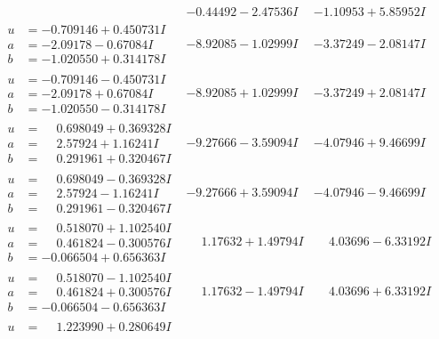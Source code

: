 \documentclass[1p]{elsarticle_modified}
\theoremstyle{definition}
\begin{document}
$$\begin{array}{c|c|c}
 & -0.44492 - 2.47536 I & -1.10953 + 5.85952 I \\ \hline\begin{aligned}
u &= -0.709146 + 0.450731 I \\
a &= -2.09178 - 0.67084 I \\
b &= -1.020550 + 0.314178 I\end{aligned}
 & -8.92085 - 1.02999 I & -3.37249 - 2.08147 I \\ \hline\begin{aligned}
u &= -0.709146 - 0.450731 I \\
a &= -2.09178 + 0.67084 I \\
b &= -1.020550 - 0.314178 I\end{aligned}
 & -8.92085 + 1.02999 I & -3.37249 + 2.08147 I \\ \hline\begin{aligned}
u &= \phantom{-}0.698049 + 0.369328 I \\
a &= \phantom{-}2.57924 + 1.16241 I \\
b &= \phantom{-}0.291961 + 0.320467 I\end{aligned}
 & -9.27666 - 3.59094 I & -4.07946 + 9.46699 I \\ \hline\begin{aligned}
u &= \phantom{-}0.698049 - 0.369328 I \\
a &= \phantom{-}2.57924 - 1.16241 I \\
b &= \phantom{-}0.291961 - 0.320467 I\end{aligned}
 & -9.27666 + 3.59094 I & -4.07946 - 9.46699 I \\ \hline\begin{aligned}
u &= \phantom{-}0.518070 + 1.102540 I \\
a &= \phantom{-}0.461824 - 0.300576 I \\
b &= -0.066504 + 0.656363 I\end{aligned}
 & \phantom{-}1.17632 + 1.49794 I & \phantom{-}4.03696 - 6.33192 I \\ \hline\begin{aligned}
u &= \phantom{-}0.518070 - 1.102540 I \\
a &= \phantom{-}0.461824 + 0.300576 I \\
b &= -0.066504 - 0.656363 I\end{aligned}
 & \phantom{-}1.17632 - 1.49794 I & \phantom{-}4.03696 + 6.33192 I \\ \hline\begin{aligned}
u &= \phantom{-}1.223990 + 0.280649 I \\

\end{aligned}
\end{array}$$
\end{document}
